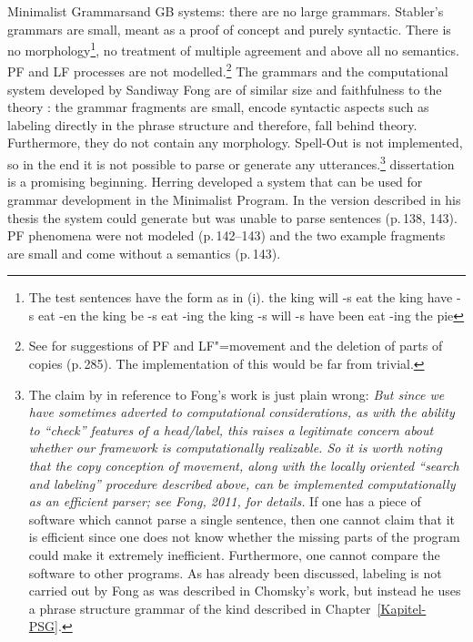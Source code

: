 Minimalist Grammars\indexmg and GB systems: there are no large grammars. Stabler's grammars are small, meant as a proof of concept and purely
syntactic. There is no morphology\footnote{%
	The test sentences have the form as in (i).
\eal
\ex the king will -s eat
\ex the king have -s eat -en
\ex the king be -s eat -ing
\ex the king -s will -s have been eat -ing the pie\vspace{-\baselineskip}%
\zllast%
}, no treatment of multiple agreement \citep[Section~27.4.3]{Stabler2010b} and above all no semantics. PF and LF
processes are not modelled.\footnote{%
	See \citet{SE2002a} for suggestions of PF and LF"=movement and the deletion of parts of copies (p.\,285).
	The implementation of this would be far from trivial.
} 
The grammars and the computational system developed by Sandiway Fong are of similar size and faithfulness
to the theory \citep{FG2012a,Fong2014a}: the grammar fragments are small,
encode syntactic aspects such as labeling directly in the phrase structure \citep[Section~4]{FG2012a} and therefore, fall behind \xbar theory.
Furthermore, they do not contain any morphology. Spell-Out is not implemented, so in the end it is not possible to parse or generate any 
utterances.\footnote{%
	The claim by \citet*[]{BPYC2011a} in reference to Fong's work is just plain wrong: \emph{But since we have
    sometimes adverted to computational considerations, as with the ability to ``check'' features of
    a head/label, this raises a legitimate concern about whether our framework is computationally
    realizable. So it is worth noting that the copy conception of movement, along with the locally
    oriented ``search and labeling'' procedure described above, can be implemented computationally
    as an efficient parser; see Fong, 2011, for details.} If one has a piece of software which cannot
	parse a single sentence, then one cannot claim that it is efficient since one does not know whether the 
	missing parts of the
	program could make it extremely inefficient. Furthermore, one cannot compare the software to other programs.
	As has already been discussed, labeling is not carried out by Fong as was described in
        Chomsky's work, but instead he uses a phrase structure grammar  of the kind described in Chapter~\ref{Kapitel-PSG}.%
}
 dissertation is a promising beginning. Herring developed a system that can be used for grammar development in the Minimalist
Program. In the version described in his thesis the system could generate but was unable to parse
sentences (p.\,138, 143). PF phenomena were not modeled (p.\,142--143) and the two example fragments
are small and come without a semantics (p.\,143).



